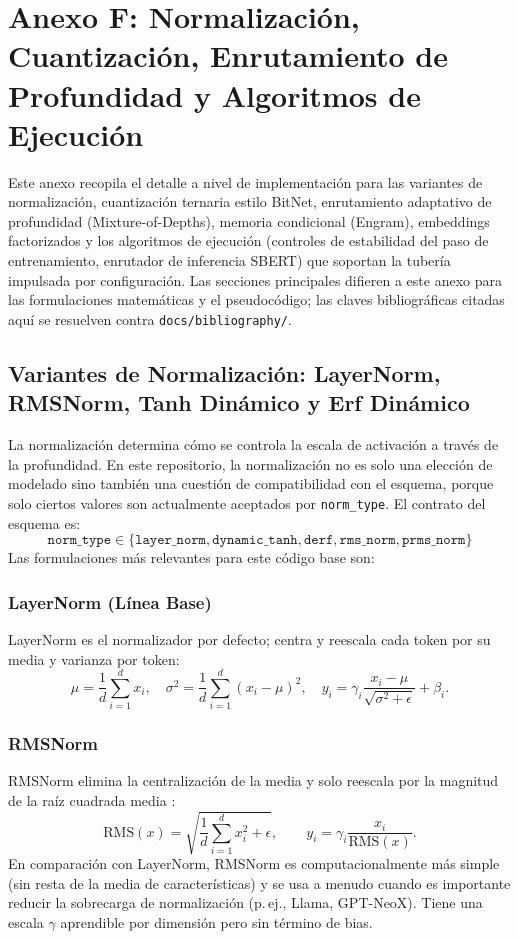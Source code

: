 \section{Anexo F: Normalización, Cuantización, Enrutamiento de Profundidad y Algoritmos de Ejecución}
\label{sec:annex-norm-bitnet-mod}

Este anexo recopila el detalle a nivel de implementación para las variantes de normalización, cuantización ternaria estilo BitNet, enrutamiento adaptativo de profundidad (Mixture-of-Depths), memoria condicional (Engram), embeddings factorizados y los algoritmos de ejecución (controles de estabilidad del paso de entrenamiento, enrutador de inferencia SBERT) que soportan la tubería impulsada por configuración. Las secciones principales difieren a este anexo para las formulaciones matemáticas y el pseudocódigo; las claves bibliográficas citadas aquí se resuelven contra \texttt{docs/bibliography/}.

\subsection{Variantes de Normalización: LayerNorm, RMSNorm, Tanh Dinámico y Erf Dinámico}

La normalización determina cómo se controla la escala de activación a través de la profundidad. En este repositorio, la normalización no es solo una elección de modelado sino también una cuestión de compatibilidad con el esquema, porque solo ciertos valores son actualmente aceptados por \texttt{norm\_type}. El contrato del esquema es:
\[
\texttt{norm\_type} \in \{\texttt{layer\_norm}, \texttt{dynamic\_tanh}, \texttt{derf}, \texttt{rms\_norm}, \texttt{prms\_norm}\}
\]
Las formulaciones más relevantes para este código base son:

\subsubsection{LayerNorm (Línea Base)}
LayerNorm \citep{ba2016layer} es el normalizador por defecto; centra y reescala cada token por su media y varianza por token:
\[
\mu = \frac{1}{d}\sum_{i=1}^{d} x_i, \quad \sigma^2 = \frac{1}{d}\sum_{i=1}^{d}(x_i - \mu)^2, \quad y_i = \gamma_i \frac{x_i - \mu}{\sqrt{\sigma^2 + \epsilon}} + \beta_i.
\]

\subsubsection{RMSNorm}
RMSNorm elimina la centralización de la media y solo reescala por la magnitud de la raíz cuadrada media \citep{zhang_root_2019}:
\[
\mathrm{RMS}(x)=\sqrt{\frac{1}{d}\sum_{i=1}^{d}x_i^2+\epsilon},\qquad
y_i=\gamma_i\frac{x_i}{\mathrm{RMS}(x)}.
\]
En comparación con LayerNorm, RMSNorm es computacionalmente más simple (sin resta de la media de características) y se usa a menudo cuando es importante reducir la sobrecarga de normalización (p.\,ej., Llama, GPT-NeoX). Tiene una escala $\gamma$ aprendible por dimensión pero sin término de bias.

